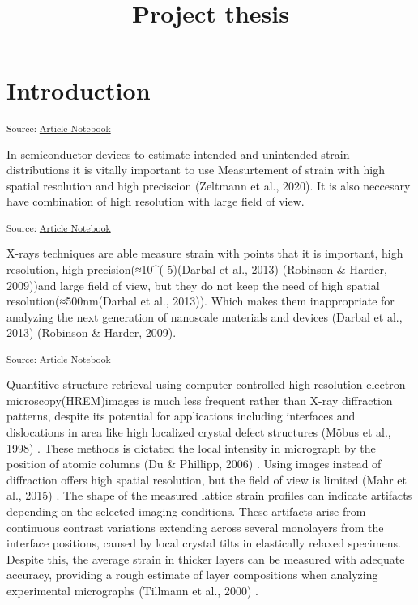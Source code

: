 \documentclass[
]{agujournal2019}
\begin{document}
\title{Project thesis}








\section{Introduction}\label{introduction}

\textsubscript{Source:
\href{https://radinrahimi1998.github.io/project-thesis/index.ipynb.html}{Article
Notebook}}

In semiconductor devices to estimate intended and unintended strain
distributions it is vitally important to use Measurtement of strain with
high spatial resolution and high preciscion (Zeltmann et al., 2020). It
is also neccesary have combination of high resolution with large field
of view.

\textsubscript{Source:
\href{https://radinrahimi1998.github.io/project-thesis/index.ipynb.html}{Article
Notebook}}

X-rays techniques are able measure strain with points that it is
important, high resolution, high precision(≈10\^{}(-5)(Darbal et al.,
2013) (Robinson \& Harder, 2009))and large field of view, but they do
not keep the need of high spatial resolution(≈500nm(Darbal et al.,
2013)). Which makes them inappropriate for analyzing the next generation
of nanoscale materials and devices (Darbal et al., 2013) (Robinson \&
Harder, 2009).

\textsubscript{Source:
\href{https://radinrahimi1998.github.io/project-thesis/index.ipynb.html}{Article
Notebook}}

Quantitive structure retrieval using computer-controlled high resolution
electron microscopy(HREM)images is much less frequent rather than X-ray
diffraction patterns, despite its potential for applications including
interfaces and dislocations in area like high localized crystal defect
structures (Möbus et al., 1998) . These methods is dictated the local
intensity in micrograph by the position of atomic columns (Du \&
Phillipp, 2006) . Using images instead of diffraction offers high
spatial resolution, but the field of view is limited (Mahr et al., 2015)
. The shape of the measured lattice strain profiles can indicate
artifacts depending on the selected imaging conditions. These artifacts
arise from continuous contrast variations extending across several
monolayers from the interface positions, caused by local crystal tilts
in elastically relaxed specimens. Despite this, the average strain in
thicker layers can be measured with adequate accuracy, providing a rough
estimate of layer compositions when analyzing experimental micrographs
(Tillmann et al., 2000) .
\end{document}
